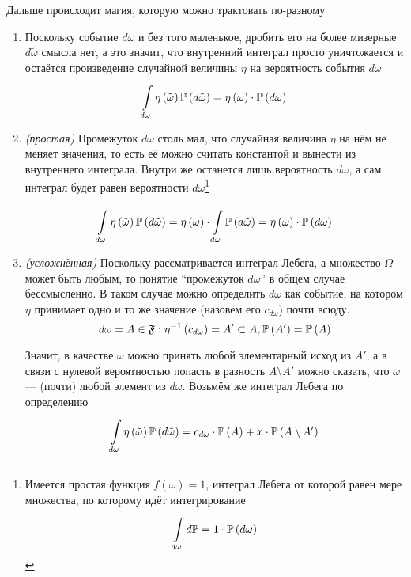Дальше происходит магия, которую можно трактовать по-разному
\begin{enumerate}[label=\bfseries Формулировка \arabic*:]
    \item Поскольку событие $d\omega$ и без того маленькое,
        дробить его на более мизерные $d\tilde{\omega}$ смысла нет,
        а это значит, что внутренний интеграл просто уничтожается
        и остаётся произведение случайной величины $\eta$
        на вероятность события $d\omega$
        $$\integralc{d\omega}{}{\probability{d\tilde{\omega}}}{
            \eta\left( \tilde{\omega} \right)}
            = \eta\left( \omega \right) \cdot \probability{d\omega}$$
    \item \textit{(простая)} Промежуток $d\omega$ столь мал,
        что случайная величина $\eta$ на нём не меняет значения,
        то есть её можно считать константой и вынести из внутреннего интеграла.
        Внутри же останется лишь вероятность $d\tilde{\omega}$,
        а сам интеграл будет равен вероятности $d\omega$\footnote{
        Имеется простая функция $f\left( \omega \right) = 1$,
        интеграл Лебега от которой равен мере множества,
        по которому идёт интегрирование
        $$\integralc{d\omega}{}{d\mathbb{P}}{}
            = 1 \cdot \probability{d\omega}$$
        }

        $$\integralc{d\omega}{}{\probability{d\tilde{\omega}}}{
            \eta\left( \tilde{\omega} \right)}
            = \eta\left( \omega \right)
                \cdot \integralc{d\omega}{}{\probability{d\tilde{\omega}}}{}
            = \eta\left( \omega \right) \cdot \probability{d\omega}$$

    \item \textit{(усложнённая)} Поскольку рассматривается интеграл Лебега,
        а множество $\Omega$ может быть любым,
        то понятие ``промежуток $d\omega$'' в общем случае бессмысленно.
        В таком случае можно определить $d\omega$ как событие,
        на котором $\eta$ принимает одно и то же значение
        (назовём его $c_{d\omega}$) почти всюду.
        $$d\omega = A \in \mathfrak{F}:
            \eta^{-1}\left( c_{d\omega} \right) = A' \subset A,
            \probability{A'} = \probability{A}$$

        Значит, в качестве $\omega$ можно принять любой
        элементарный исход из $A'$,
        а в связи с нулевой вероятностью попасть в разность $A \setminus A'$
        можно сказать, что $\omega$ --- (почти) любой элемент из $d\omega$.
        Возьмём же интеграл Лебега по определению \cite[стр.~69]{DorogovtsevIT}
        $$\integralc{d\omega}{}{\probability{d\tilde{\omega}}}{
            \eta\left( \tilde{\omega}\right)}
            = c_{d\omega} \cdot \probability{A}
                + x \cdot \probability{A \setminus A'}$$


\end{enumerate}
